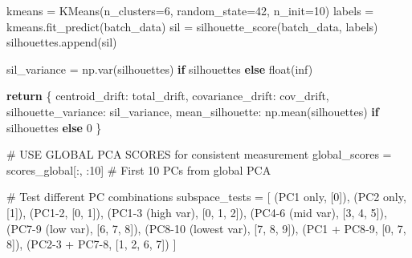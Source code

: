 \documentclass[
  letterpaper,
  DIV=11,
  numbers=noendperiod]{scrartcl}
\newenvironment{Shaded}{\begin{snugshade}}{\end{snugshade}}
\newcommand{\BuiltInTok}[1]{\textcolor[rgb]{0.00,0.23,0.31}{#1}}
\newcommand{\CommentTok}[1]{\textcolor[rgb]{0.37,0.37,0.37}{#1}}
\newcommand{\ControlFlowTok}[1]{\textcolor[rgb]{0.00,0.23,0.31}{\textbf{#1}}}
\newcommand{\DecValTok}[1]{\textcolor[rgb]{0.68,0.00,0.00}{#1}}
\newcommand{\NormalTok}[1]{\textcolor[rgb]{0.00,0.23,0.31}{#1}}
\newcommand{\OperatorTok}[1]{\textcolor[rgb]{0.37,0.37,0.37}{#1}}
\newcommand{\StringTok}[1]{\textcolor[rgb]{0.13,0.47,0.30}{#1}}
\renewenvironment{Shaded}{%
  \begin{tcolorbox}[%
    enhanced,%
    colback=codebg,%
    colframe=codebg,%
    borderline west={3pt}{0pt}{sectionblue},%
    fontupper=\small\ttfamily,%
    boxrule=0pt,%
    arc=0pt,%
    boxsep=5pt,%
    left=2mm,%
    right=2mm,%
    top=2mm,%
    bottom=2mm%
  ]%
}{%
  \end{tcolorbox}%
}
\begin{document}
\begin{Shaded}
\begin{Highlighting}[]
\NormalTok{            kmeans }\OperatorTok{=}\NormalTok{ KMeans(n\_clusters}\OperatorTok{=}\DecValTok{6}\NormalTok{, random\_state}\OperatorTok{=}\DecValTok{42}\NormalTok{, n\_init}\OperatorTok{=}\DecValTok{10}\NormalTok{)}
\NormalTok{            labels }\OperatorTok{=}\NormalTok{ kmeans.fit\_predict(batch\_data)}
\NormalTok{            sil }\OperatorTok{=}\NormalTok{ silhouette\_score(batch\_data, labels)}
\NormalTok{            silhouettes.append(sil)}
    
\NormalTok{    sil\_variance }\OperatorTok{=}\NormalTok{ np.var(silhouettes) }\ControlFlowTok{if}\NormalTok{ silhouettes }\ControlFlowTok{else} \BuiltInTok{float}\NormalTok{(}\StringTok{\textquotesingle{}inf\textquotesingle{}}\NormalTok{)}
    
    \ControlFlowTok{return}\NormalTok{ \{}
        \StringTok{\textquotesingle{}centroid\_drift\textquotesingle{}}\NormalTok{: total\_drift,}
        \StringTok{\textquotesingle{}covariance\_drift\textquotesingle{}}\NormalTok{: cov\_drift,}
        \StringTok{\textquotesingle{}silhouette\_variance\textquotesingle{}}\NormalTok{: sil\_variance,}
        \StringTok{\textquotesingle{}mean\_silhouette\textquotesingle{}}\NormalTok{: np.mean(silhouettes) }\ControlFlowTok{if}\NormalTok{ silhouettes }\ControlFlowTok{else} \DecValTok{0}
\NormalTok{    \}}

\CommentTok{\# USE GLOBAL PCA SCORES for consistent measurement}
\NormalTok{global\_scores }\OperatorTok{=}\NormalTok{ scores\_global[:, :}\DecValTok{10}\NormalTok{]  }\CommentTok{\# First 10 PCs from global PCA}

\CommentTok{\# Test different PC combinations}
\NormalTok{subspace\_tests }\OperatorTok{=}\NormalTok{ [}
\NormalTok{    (}\StringTok{\textquotesingle{}PC1 only\textquotesingle{}}\NormalTok{, [}\DecValTok{0}\NormalTok{]),}
\NormalTok{    (}\StringTok{\textquotesingle{}PC2 only\textquotesingle{}}\NormalTok{, [}\DecValTok{1}\NormalTok{]),}
\NormalTok{    (}\StringTok{\textquotesingle{}PC1{-}2\textquotesingle{}}\NormalTok{, [}\DecValTok{0}\NormalTok{, }\DecValTok{1}\NormalTok{]),}
\NormalTok{    (}\StringTok{\textquotesingle{}PC1{-}3 (high var)\textquotesingle{}}\NormalTok{, [}\DecValTok{0}\NormalTok{, }\DecValTok{1}\NormalTok{, }\DecValTok{2}\NormalTok{]),}
\NormalTok{    (}\StringTok{\textquotesingle{}PC4{-}6 (mid var)\textquotesingle{}}\NormalTok{, [}\DecValTok{3}\NormalTok{, }\DecValTok{4}\NormalTok{, }\DecValTok{5}\NormalTok{]),}
\NormalTok{    (}\StringTok{\textquotesingle{}PC7{-}9 (low var)\textquotesingle{}}\NormalTok{, [}\DecValTok{6}\NormalTok{, }\DecValTok{7}\NormalTok{, }\DecValTok{8}\NormalTok{]),}
\NormalTok{    (}\StringTok{\textquotesingle{}PC8{-}10 (lowest var)\textquotesingle{}}\NormalTok{, [}\DecValTok{7}\NormalTok{, }\DecValTok{8}\NormalTok{, }\DecValTok{9}\NormalTok{]),}
\NormalTok{    (}\StringTok{\textquotesingle{}PC1 + PC8{-}9\textquotesingle{}}\NormalTok{, [}\DecValTok{0}\NormalTok{, }\DecValTok{7}\NormalTok{, }\DecValTok{8}\NormalTok{]),}
\NormalTok{    (}\StringTok{\textquotesingle{}PC2{-}3 + PC7{-}8\textquotesingle{}}\NormalTok{, [}\DecValTok{1}\NormalTok{, }\DecValTok{2}\NormalTok{, }\DecValTok{6}\NormalTok{, }\DecValTok{7}\NormalTok{])}
\NormalTok{]}


\end{Highlighting}
\end{Shaded}
\end{document}
